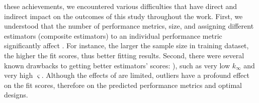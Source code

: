     \DIFdelbegin {}\DIFdelend \DIFaddbegin {}\DIFaddend these achievements, we encountered various difficulties that have \DIFdelbegin {}\DIFdelend \DIFaddbegin {}\DIFaddend direct and indirect impact on the outcomes of this study throughout the work. First, we understood that the number of performance metrics, \DIFdelbegin {}\DIFdelend \DIFaddbegin {}\DIFaddend size, and assigning different estimators (composite estimators) to an individual performance metric significantly affect \DIFdelbegin {}\DIFdelend \DIFaddbegin {}\DIFaddend . For instance, the larger the sample size in \DIFdelbegin {}\DIFdelend \DIFaddbegin {}\DIFaddend training dataset, the higher the fit scores, thus better fitting results. Second, there were several known drawbacks to getting better estimators' scores: \DIFdelbegin {}\DIFdelend \DIFaddbegin {}\DIFaddend ), such as very low $k_{\infty}$ and very high $\varsigma$. Although the effects of \DIFdelbegin {}\DIFdelend \DIFaddbegin {}\DIFaddend are limited, outliers have a profound effect on the fit scores, therefore on the predicted performance metrics and optimal designs.

